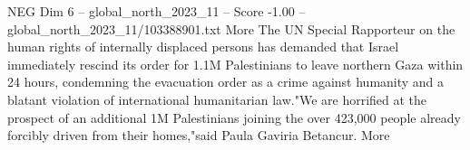 \begin{textsample}{NEG Dim 6 – global\_north\_2023\_11 – Score -1.00 – global\_north\_2023\_11/103388901.txt}
More The UN Special Rapporteur on the human rights of internally displaced persons has demanded that Israel immediately rescind its order for 1.1M Palestinians to leave northern Gaza within 24 hours, condemning the evacuation order as a crime against humanity and a blatant violation of international humanitarian law."We are horrified at the prospect of an additional 1M Palestinians joining the over 423,000 people already forcibly driven from their homes,"said Paula Gaviria Betancur.
More

\end{textsample}
